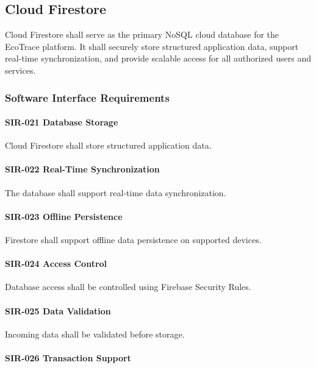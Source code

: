 \subsection{Cloud Firestore}

Cloud Firestore shall serve as the primary NoSQL cloud database for the
EcoTrace platform. It shall securely store structured application data,
support real-time synchronization, and provide scalable access for all
authorized users and services.


\subsubsection*{Software Interface Requirements}

\paragraph{SIR-021 Database Storage}

Cloud Firestore shall store structured application data.

\paragraph{SIR-022 Real-Time Synchronization}

The database shall support real-time data synchronization.

\paragraph{SIR-023 Offline Persistence}

Firestore shall support offline data persistence on supported devices.

\paragraph{SIR-024 Access Control}

Database access shall be controlled using Firebase Security Rules.

\paragraph{SIR-025 Data Validation}

Incoming data shall be validated before storage.

\paragraph{SIR-026 Transaction Support}

